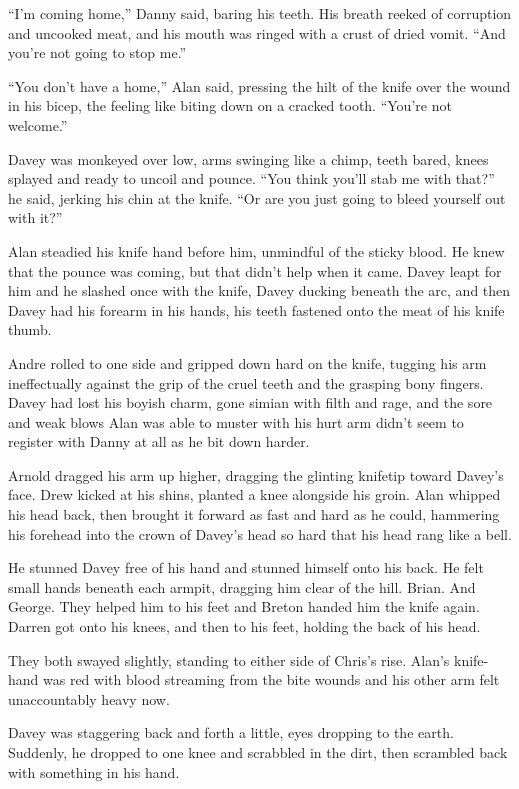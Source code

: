 ``I'm coming home,'' Danny said, baring his teeth.  His breath reeked
of corruption and uncooked meat, and his mouth was ringed with a crust
of dried vomit.  ``And you're not going to stop me.''

``You don't have a home,'' Alan said, pressing the hilt of the knife
over the wound in his bicep, the feeling like biting down on a cracked
tooth.  ``You're not welcome.''

Davey was monkeyed over low, arms swinging like a chimp, teeth bared,
knees splayed and ready to uncoil and pounce.  ``You think you'll stab
me with that?'' he said, jerking his chin at the knife.  ``Or are you
just going to bleed yourself out with it?''

Alan steadied his knife hand before him, unmindful of the sticky
blood.  He knew that the pounce was coming, but that didn't help when
it came.  Davey leapt for him and he slashed once with the knife,
Davey ducking beneath the arc, and then Davey had his forearm in his
hands, his teeth fastened onto the meat of his knife thumb.

Andre rolled to one side and gripped down hard on the knife, tugging
his arm ineffectually against the grip of the cruel teeth and the
grasping bony fingers.  Davey had lost his boyish charm, gone simian
with filth and rage, and the sore and weak blows Alan was able to
muster with his hurt arm didn't seem to register with Danny at all as
he bit down harder.

Arnold dragged his arm up higher, dragging the glinting knifetip
toward Davey's face.  Drew kicked at his shins, planted a knee
alongside his groin.  Alan whipped his head back, then brought it
forward as fast and hard as he could, hammering his forehead into the
crown of Davey's head so hard that his head rang like a bell.

He stunned Davey free of his hand and stunned himself onto his back. 
He felt small hands beneath each armpit, dragging him clear of the
hill.  Brian.  And George.  They helped him to his feet and Breton
handed him the knife again.  Darren got onto his knees, and then to
his feet, holding the back of his head.

They both swayed slightly, standing to either side of Chris's rise. 
Alan's knife-hand was red with blood streaming from the bite wounds
and his other arm felt unaccountably heavy now.

Davey was staggering back and forth a little, eyes dropping to the
earth.  Suddenly, he dropped to one knee and scrabbled in the dirt,
then scrambled back with something in his hand.

